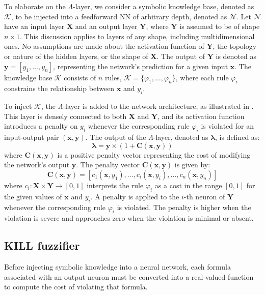 To elaborate on the $\Lambda$-layer, we consider a symbolic knowledge base, denoted as \(\mathcal{K}\), to be injected into a feedforward \gls{NN} of arbitrary depth, denoted as \(\mathcal{N}\).
%
Let \(\mathcal{N}\) have an input layer \(\mathbf{X}\) and an output layer \(\mathbf{Y}\), where \(\mathbf{Y}\) is assumed to be of shape \(n \times 1\).
%
This discussion applies to layers of any shape, including multidimensional ones.
%
No assumptions are made about the activation function of \(\mathbf{Y}\), the topology or nature of the hidden layers, or the shape of \(\mathbf{X}\).
%
The output of \(\mathbf{Y}\) is denoted as \(\mathbf{y} = [y_1, \dots, y_n]\), representing the network's prediction for a given input \(\mathbf{x}\).
%
The knowledge base \(\mathcal{K}\) consists of \(n\) rules, \(\mathcal{K} = \{\varphi_1, \dots, \varphi_n\}\), where each rule \(\varphi_i\) constrains the relationship between \(\mathbf{x}\) and \(y_i\).


To inject \(\mathcal{K}\), the $\Lambda$-layer is added to the network architecture, as illustrated in .
%
This layer is densely connected to both \(\mathbf{X}\) and \(\mathbf{Y}\), and its activation function introduces a penalty on \(y_i\) whenever the corresponding rule \(\varphi_i\) is violated for an input-output pair \((\mathbf{x}, \mathbf{y})\).
%
The output of the $\Lambda$-layer, denoted as \(\boldsymbol{\lambda}\), is defined as:
%
\[
\boldsymbol{\lambda} = \mathbf{y} \times (1 + \mathbf{C}(\mathbf{x}, \mathbf{y}))
\]
%
where \(\mathbf{C}(\mathbf{x}, \mathbf{y})\) is a positive penalty vector representing the cost of modifying the network's output \(\mathbf{y}\).
%
The penalty vector \(\mathbf{C}(\mathbf{x}, \mathbf{y})\) is given by:
%
\[
\mathbf{C}(\mathbf{x}, \mathbf{y}) = [c_1(\mathbf{x}, y_1), \dots, c_i(\mathbf{x}, y_i), \dots, c_n(\mathbf{x}, y_n)]
\]
%
where \(c_i : \mathbf{X} \times \mathbf{Y} \to [0, 1]\) interprets the rule \(\varphi_i\) as a cost in the range \([0, 1]\) for the given values of \(\mathbf{x}\) and \(y_i\).
%
A penalty is applied to the \(i\)-th neuron of \(\mathbf{Y}\) whenever the corresponding rule \(\varphi_i\) is violated.
%
The penalty is higher when the violation is severe and approaches zero when the violation is minimal or absent.


\subsection{KILL fuzzifier}\label{subsec:kill-fuzzifier}
%

%

%
Before injecting symbolic knowledge into a neural network, each formula associated with an output neuron must be converted into a real-valued function to compute the cost of violating that formula.

